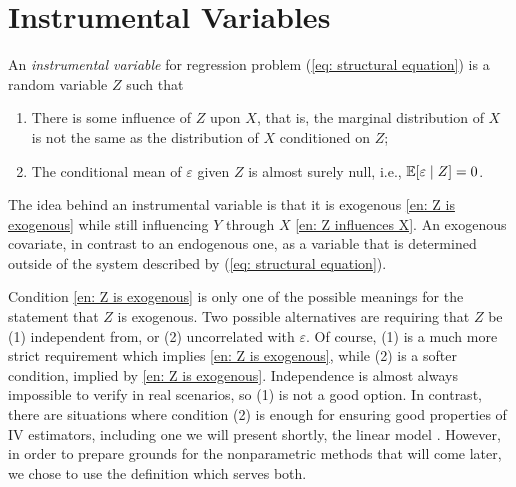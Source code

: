 \section{Instrumental Variables}

\begin{deff}
    \label{def: iv}
    An \emph{instrumental variable} for regression problem (\ref{eq: structural equation}) is a random variable $ Z $ such that
    \begin{enumerate}
        \item There is some influence of $ Z $ upon $ X $, that is, the marginal distribution of $ X $ is not the same as the distribution of $ X $ conditioned on $ Z $; \label{en: Z influences X}
        \item The conditional mean of $ \varepsilon $ given $ Z $ is almost surely null, i.e., $ \mathbb{E} [ \varepsilon \mid Z ] = 0 $. \label{en: Z is exogenous}
    \end{enumerate}
\end{deff}


The idea behind an instrumental variable is that it is exogenous \ref{en: Z is exogenous} while still influencing $ Y $ through $ X $ \ref{en: Z influences X}.
An exogenous covariate, in contrast to an endogenous one, as a variable that is determined outside of the system described by (\ref{eq: structural equation}).

Condition \ref{en: Z is exogenous} is only one of the possible meanings for the statement that $ Z $ is exogenous.
Two possible alternatives are requiring that $ Z $ be (1) independent from, or (2) uncorrelated with $ \varepsilon $.
Of course, (1) is a much more strict requirement which implies \ref{en: Z is exogenous}, while (2) is a softer condition, implied by \ref{en: Z is exogenous}.
Independence is almost always impossible to verify in real scenarios, so (1) is not a good option.
In contrast, there are situations where condition (2) is enough for ensuring good properties of IV estimators, including one we will present shortly, the linear model \cite{wooldridge2001}.
However, in order to prepare grounds for the nonparametric methods that will come later, we chose to use the definition which serves both.

